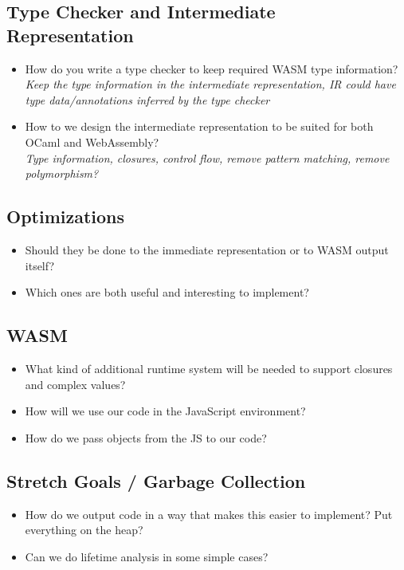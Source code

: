 \documentclass{report}
\begin{document}
\subsection{Type Checker and Intermediate Representation}
\begin{itemize}
\item How do you write a type checker to keep required WASM type information?
      \\ \textit{Keep the type information in the intermediate representation, IR could have type data/annotations inferred by the type checker}
\item How to we design the intermediate representation to be suited for both OCaml and WebAssembly?
      \\ \textit{Type information, closures, control flow, remove pattern matching, remove polymorphism?}
\end{itemize}

\subsection{Optimizations}
\begin{itemize}
\item Should they be done to the immediate representation or to WASM output itself?
\item Which ones are both useful and interesting to implement?
\end{itemize}

\subsection{WASM}
\begin{itemize}
\item What kind of additional runtime system will be needed to support closures and complex values?
\item How will we use our code in the JavaScript environment?
\item How do we pass objects from the JS to our code?
\end{itemize}


\subsection{Stretch Goals / Garbage Collection}
\begin{itemize}
\item How do we output code in a way that makes this easier to implement? Put everything on the heap?
\item Can we do lifetime analysis in some simple cases?
\end{itemize}
\end{document}
